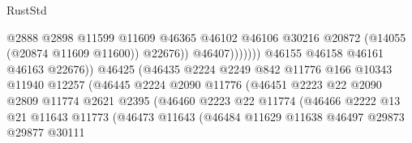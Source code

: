 \begin{lexlean}{RustStd}
\begin{coremodule}
                                                  @2888
                                                  @2898
                                                  @11599
                                                  @11609
                                                  @46365
                                                  @46102
                                                  @46106
                                                  @30216
                                                  @20872
                                                  (@14055 (@20874 @11609 @11600))
                                                  @22676))
                                              @46407)))))))
                                @46155
                                @46158
                                @46161
                                @46163
                                @22676))
                            @46425
                            (@46435
                              @2224
                              @2249
                              @842
                              @11776
                              @166
                              @10343
                              @11940
                              @12257
                              (@46445
                                @2224
                                @2090
                                @11776
                                (@46451
                                  @2223
                                  @22
                                  @2090
                                  @2809
                                  @11774
                                  @2621
                                  @2395
                                  (@46460
                                    @2223
                                    @22
                                    @11774
                                    (@46466
                                      @2222
                                      @13
                                      @21
                                      @11643
                                      @11773
                                      (@46473
                                        @11643
                                        (@46484
                                          @11629
                                          @11638
                                          @46497
                                          @29873
                                          @29877
                                          @30111

\end{coremodule}
\end{lexlean}
